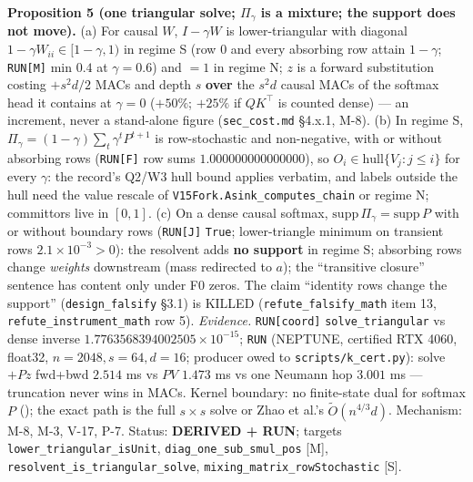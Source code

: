 \documentclass[11pt,a4paper]{article}
\theoremstyle{plain}
\theoremstyle{definition}
\theoremstyle{remark}
\begin{document}
\textbf{Proposition 5 (one triangular solve; \(\Pi_\gamma\) is a
mixture; the support does not move).} (a) For causal \(W\),
\(I-\gamma W\) is lower-triangular with diagonal
\(1-\gamma W_{ii}\in[1-\gamma,1)\) in regime S (row 0 and every
absorbing row attain \(1-\gamma\); \texttt{RUN{[}M{]}} min \(0.4\) at
\(\gamma=0.6\)) and \(=1\) in regime N; \(z\) is a forward substitution
costing \(+s^2d/2\) MACs and depth \(s\) \textbf{over} the \(s^2d\)
causal MACs of the softmax head it contains at \(\gamma=0\) (\(+50\%\);
\(+25\%\) if \(QK^\top\) is counted dense) --- an increment, never a
stand-alone figure (\texttt{sec\_cost.md} §4.x.1, M-8). (b) In regime S,
\(\Pi_\gamma=(1-\gamma)\sum_t\gamma^tP^{t+1}\) is row-stochastic and
non-negative, with or without absorbing rows (\texttt{RUN{[}F{]}} row
sums \(1.000000000000000\)), so \(O_i\in\mathrm{hull}\{V_j:j\le i\}\)
for every \(\gamma\): the record's Q2/W3 hull bound applies verbatim,
and labels outside the hull need the value rescale of
\texttt{V15Fork.Asink\_computes\_chain} or regime N; committors live in
\([0,1]\). (c) On a dense causal softmax,
\(\mathrm{supp}\,\Pi_\gamma=\mathrm{supp}\,P\) with or without boundary
rows (\texttt{RUN{[}J{]}} \texttt{True}; lower-triangle minimum on
transient rows \(2.1\times10^{-3}>0\)): the resolvent adds \textbf{no
support} in regime S; absorbing rows change \emph{weights} downstream
(mass redirected to \(a\)); the ``transitive closure'' sentence has
content only under F0 zeros. The claim ``identity rows change the
support'' (\texttt{design\_falsify} §3.1) is KILLED
(\texttt{refute\_falsify\_math} item 13,
\texttt{refute\_instrument\_math} row 5). \emph{Evidence.}
\texttt{RUN{[}coord{]}} \texttt{solve\_triangular} vs dense inverse
\(1.7763568394002505\times10^{-15}\); \texttt{RUN} (NEPTUNE, certified
RTX 4060, float32, \(n=2048,s=64,d=16\); producer owed to
\texttt{scripts/k\_cert.py}): solve\(+Pz\) fwd+bwd \(2.514\) ms vs
\(PV\) \(1.473\) ms vs one Neumann hop \(3.001\) ms --- truncation never
wins in MACs. Kernel boundary: no finite-state dual for softmax \(P\)
(\citep{hu-2025-ssdtheory}); the exact path is the full \(s\times s\)
solve or Zhao et al.'s \(\tilde O(n^{4/3}d)\). Mechanism: M-8, M-3,
V-17, P-7. Status: \textbf{DERIVED + RUN}; targets
\texttt{lower\_triangular\_isUnit}, \texttt{diag\_one\_sub\_smul\_pos}
{[}M{]}, \texttt{resolvent\_is\_triangular\_solve},
\texttt{mixing\_matrix\_rowStochastic} {[}S{]}.
\end{document}
